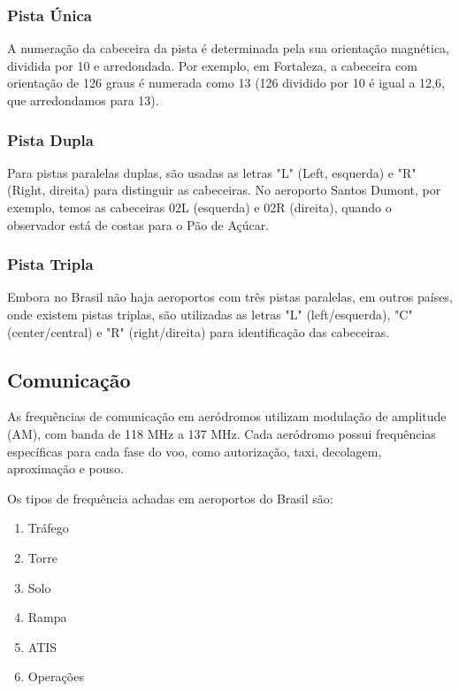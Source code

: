 \subsubsection{Pista Única}

A numeração da cabeceira da pista é determinada pela sua orientação magnética, 
dividida por 10 e arredondada. Por exemplo, em Fortaleza, a cabeceira com 
orientação de 126 graus é numerada como 13 (126 dividido por 10 é igual a 
12,6, que arredondamos para 13).

\subsubsection{Pista Dupla}

Para pistas paralelas duplas, são usadas as letras "L" (Left, esquerda) e "R" 
(Right, direita) para distinguir as cabeceiras. No aeroporto Santos Dumont, por 
exemplo, temos as cabeceiras 02L (esquerda) e 02R (direita), quando o observador 
está de costas para o Pão de Açúcar.

\subsubsection{Pista Tripla}

Embora no Brasil não haja aeroportos com três pistas paralelas, em outros países, 
onde existem pistas triplas, são utilizadas as letras "L" (left/esquerda), "C" 
(center/central) e "R" (right/direita) para identificação das cabeceiras.

\subsection{Comunicação}

As frequências de comunicação em aeródromos utilizam modulação de amplitude (AM), com banda 
de 118 MHz a 137 MHz. Cada aeródromo possui frequências específicas para cada fase 
do voo, como autorização, taxi, decolagem, aproximação e pouso.

Os tipos de frequência achadas em aeroportos do Brasil são:

\begin{enumerate}
\item Tráfego
\item Torre
\item Solo
\item Rampa
\item ATIS
\item Operações
\end{enumerate}

